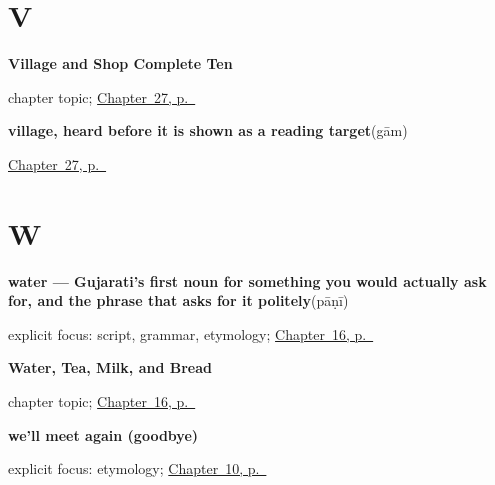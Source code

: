 \section*{V}

\noindent\begin{minipage}[t]{\linewidth}
\raggedright
\textbf{Village and Shop Complete Ten}\par
\footnotesize chapter topic; \hyperref[ch:gu-village-shop-ten]{Chapter~27, p.~\pageref*{ch:gu-village-shop-ten}}
\end{minipage}\par\smallskip

\noindent\begin{minipage}[t]{\linewidth}
\raggedright
\textbf{village, heard before it is shown as a reading target}\enspace\emph{}\enspace(gām)\par
\footnotesize \hyperref[ch:gu-village-shop-ten]{Chapter~27, p.~\pageref*{ch:gu-village-shop-ten}}
\end{minipage}\par\smallskip

\section*{W}

\noindent\begin{minipage}[t]{\linewidth}
\raggedright
\textbf{water — Gujarati's first noun for something you would actually ask for, and the phrase that asks for it politely}\enspace\emph{}\enspace(pāṇī)\par
\footnotesize explicit focus: script, grammar, etymology; \hyperref[ch:gu-request-food-drink]{Chapter~16, p.~\pageref*{ch:gu-request-food-drink}}
\end{minipage}\par\smallskip

\noindent\begin{minipage}[t]{\linewidth}
\raggedright
\textbf{Water, Tea, Milk, and Bread}\par
\footnotesize chapter topic; \hyperref[ch:gu-request-food-drink]{Chapter~16, p.~\pageref*{ch:gu-request-food-drink}}
\end{minipage}\par\smallskip

\noindent\begin{minipage}[t]{\linewidth}
\raggedright
\textbf{we'll meet again (goodbye)}\enspace\emph{ }\par
\footnotesize explicit focus: etymology; \hyperref[ch:farewells]{Chapter~10, p.~\pageref*{ch:farewells}}
\end{minipage}\par\smallskip

